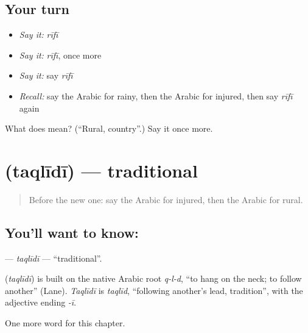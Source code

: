 \subsection*{Your turn}
\begin{itemize}
\raggedright
  \item \emph{Say it:} \emph{rīfī}
  \item \emph{Say it:} \emph{rīfī}, once more
  \item \emph{Say it:} say \emph{rīfī}
  \item \emph{Recall:} say the Arabic for rainy, then the Arabic for injured, then say \emph{rīfī} again
\end{itemize}

\begin{tcolorbox}[breakable,colback=teal!4,colframe=teal!35!black,title={Before you move on}]
What does  mean? (\textquotedblleft{}Rural, country\textquotedblright{}.) Say it once more.
\end{tcolorbox}
\section[\texorpdfstring{\ar{تقليدي} (taqlīdī)}{تقليدي (taqlīdī)}]{ (taqlīdī) — traditional}

\label{lesson:AR-C180-taqlidi}



\begin{quote}
Before the new one: say the Arabic for injured, then the Arabic for rural.
\end{quote}

\subsection*{You'll want to know: }
\textbf{} — \emph{taqlīdī} — \textquotedblleft{}traditional\textquotedblright{}.

\begin{cousinweb}
\textbf{} (\emph{taqlīdī}) is built on the native Arabic root \emph{q-l-d}, \textquotedblleft{}to hang on the neck; to follow another\textquotedblright{} (Lane). \emph{Taqlīdī} is \emph{taqlīd}, \textquotedblleft{}following another's lead, tradition\textquotedblright{}, with the adjective ending \emph{-ī}.
\end{cousinweb}

\begin{grammarlens}[title={What you've built}]
One more word for this chapter.
\end{grammarlens}

